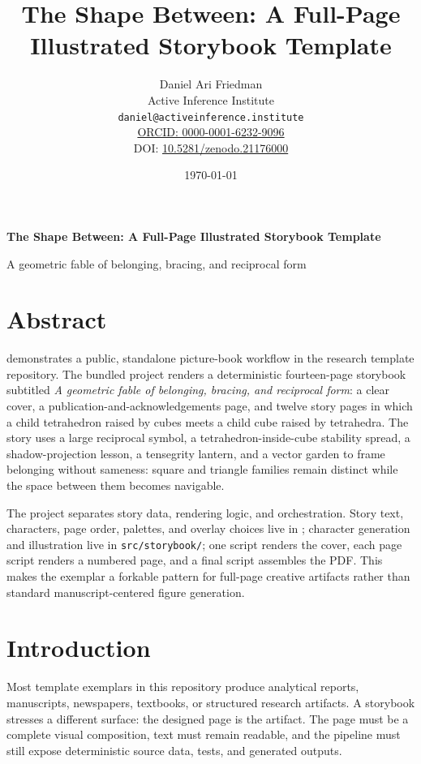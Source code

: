 \documentclass[
]{article}
\author{}
\date{}
\title{The Shape Between: A Full-Page Illustrated Storybook Template}
\author{Daniel Ari Friedman\\\footnotesize{Active Inference Institute}\\\footnotesize{\texttt{daniel@activeinference.institute}}\\\footnotesize{\href{https://orcid.org/0000-0001-6232-9096}{ORCID: 0000-0001-6232-9096}} \\ \footnotesize{DOI: \href{https://doi.org/10.5281/zenodo.21176000}{10.5281/zenodo.21176000}}}
\date{\today}
\begin{document}
\begin{titlepage}
\centering
\vspace*{2cm}
{\LARGE\bfseries The Shape Between: A Full-Page Illustrated Storybook Template\par}
\vspace{0.75em}
{\large A geometric fable of belonging, bracing, and reciprocal form\par}
\vfill
\makeatletter
{\@author\par}
\vspace{1em}
{\@date\par}
\makeatother
\vfill
\end{titlepage}
\thispagestyle{empty}
\tableofcontents
\newpage


\section{Abstract}\label{abstract}

 demonstrates a public, standalone
picture-book workflow in the research template repository. The bundled
project renders a deterministic fourteen-page storybook subtitled
\emph{A geometric fable of belonging, bracing, and reciprocal form}: a
clear cover, a publication-and-acknowledgements page, and twelve story
pages in which a child tetrahedron raised by cubes meets a child cube
raised by tetrahedra. The story uses a large reciprocal symbol, a
tetrahedron-inside-cube stability spread, a shadow-projection lesson, a
tensegrity lantern, and a vector garden to frame belonging without
sameness: square and triangle families remain distinct while the space
between them becomes navigable.

The project separates story data, rendering logic, and orchestration.
Story text, characters, page order, palettes, and overlay choices live
in ; character generation and illustration
live in \texttt{src/storybook/}; one script renders the cover, each page
script renders a numbered page, and a final script assembles the PDF.
This makes the exemplar a forkable pattern for full-page creative
artifacts rather than standard manuscript-centered figure generation.

\newpage

\section{Introduction}\label{introduction}

Most template exemplars in this repository produce analytical reports,
manuscripts, newspapers, textbooks, or structured research artifacts. A
storybook stresses a different surface: the designed page is the
artifact. The page must be a complete visual composition, text must
remain readable, and the pipeline must still expose deterministic source
data, tests, and generated outputs.
\end{document}
